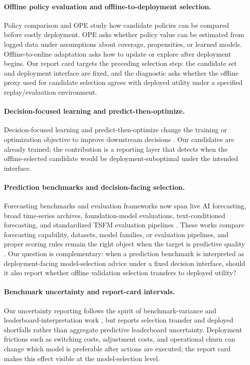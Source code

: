 \documentclass{article}
\begin{document}
\paragraph{Offline policy evaluation and offline-to-deployment selection.} Policy comparison and OPE study how candidate policies can be compared before costly deployment. OPE asks whether policy value can be estimated from logged data under assumptions about coverage, propensities, or learned models. Offline-to-online adaptation asks how to update or explore after deployment begins. Our report card targets the preceding selection step: the candidate set and deployment interface are fixed, and the diagnostic asks whether the offline proxy used for candidate selection agrees with deployed utility under a specified replay/evaluation environment.

\paragraph{Decision-focused learning and predict-then-optimize.} Decision-focused learning and predict-then-optimize change the training or optimization objective to improve downstream decisions \cite{raeth2025,donti2017task,elmachtoub2021spo,mandi2024decisionfocused}. Our candidates are already trained; the contribution is a reporting layer that detects when the offline-selected candidate would be deployment-suboptimal under the intended interface.

\paragraph{Prediction benchmarks and decision-facing selection.} Forecasting benchmarks and evaluation frameworks now span live AI forecasting, broad time-series archives, foundation-model evaluations, text-conditioned forecasting, and standardized TSFM evaluation pipelines \cite{forecastbench,prophetarena,gifteval,godahewa2021monash,das2024timesfm,williams2025contextkey,tsfmbench2025,tempusbench2026,timerecipe2025}. These works compare forecasting capability, datasets, model families, or evaluation pipelines, and proper scoring rules remain the right object when the target is predictive quality \cite{gneiting2007,murphy1993}. Our question is complementary: when a prediction benchmark is interpreted as deployment-facing model-selection advice under a fixed decision interface, should it also report whether offline validation selection transfers to deployed utility?

\paragraph{Benchmark uncertainty and report-card intervals.} Our uncertainty reporting follows the spirit of benchmark-variance and leaderboard-interpretation work \cite{bouthillier2021variance,longjohn2025aggregate,fevbench2025,brigato2025nochampions}, but reports selection transfer and deployed shortfalls rather than aggregate predictive leaderboard uncertainty. Deployment frictions such as switching costs, adjustment costs, and operational churn can change which model is preferable after actions are executed; the report card makes this effect visible at the model-selection level.
\end{document}
